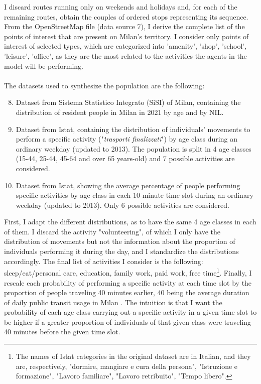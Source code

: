 I discard routes running only on weekends and holidays and, for each of the remaining routes, obtain the couples of ordered stops representing its sequence. From the OpenStreetMap file (data source 7), I derive the complete list of the points of interest that are present on Milan's territory. I consider only points of interest of selected types, which are categorized into 'amenity', 'shop', 'school', 'leisure', 'office', as they are the most related to the activities the agents in the model will be performing. \\\\
The datasets used to synthesize the population are the following:
\begin{enumerate}
\setcounter{enumi}{7}
    \item Dataset \cite{site18} from Sistema Statistico Integrato (SiSI) of Milan, containing the distribution of resident people in Milan in 2021 by age and by NIL.
    \item Dataset \cite{site10} from Istat, containing the distribution of individuals' movements to perform a specific activity ("\textit{trasporti finalizzati}") by age class during an ordinary weekday (updated to 2013). The population is split in 4 age classes (15-44, 25-44, 45-64 and over 65 years-old) and 7 possible activities are considered.
    \item Dataset \cite{site11} from Istat, showing the average percentage of people performing specific activities by age class in each 10-minute time slot during an ordinary weekday (updated to 2013). Only 6 possible activities are considered.
\end{enumerate}
First, I adapt the different distributions, as to have the same 4 age classes in each of them. I discard the activity "volunteering", of which I only have the distribution of movements but not the information about the proportion of individuals performing it during the day, and I standardize the distributions accordingly. The final list of activities I consider is the following: sleep/eat/personal care, education, family work, paid work, free time\footnote{The names of Istat categories in the original dataset are in Italian, and they are, respectively, "dormire, mangiare e cura della persona", "Istruzione e formazione", "Lavoro familiare", "Lavoro retribuito", "Tempo libero".}. Finally, I rescale each probability of performing a specific activity at each time slot by the proportion of people traveling 40 minutes earlier, 40 being the average duration of daily public transit usage in Milan \cite{bib2}. The intuition is that I want the probability of each age class carrying out a specific activity in a given time slot to be higher if a greater proportion of individuals of that given class were traveling 40 minutes before the given time slot.

